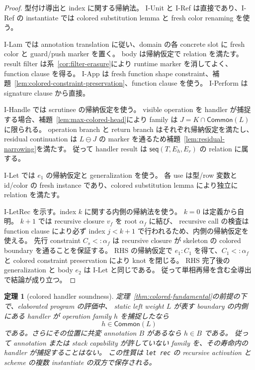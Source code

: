 \documentclass[uplatex,dvipdfmx,a4paper,10.5pt]{jsarticle}
\theoremstyle{jpplain}
\newtheorem{theorem}[definition]{定理}
\newcommand{\seq}{\mathsf{seq}}
\newcommand{\Common}{\mathsf{Common}}
\begin{document}
\begin{proof}
型付け導出と index に関する帰納法。
I-Unit と I-Ref は直接であり、I-Ref の instantiate では colored substitution lemma と fresh color renaming を使う。

I-Lam では annotation translation に従い、domain の各 concrete slot に fresh color と guard/push marker を置く。
body は帰納仮定で relation を満たす。
result filter は系~\ref{cor:filter-erasure}により runtime marker を消してよく、function clause を得る。
I-App は fresh function shape constraint、補題~\ref{lem:colored-constraint-preservation}、function clause を使う。
I-Perform は signature clause から直接。

I-Handle では scrutinee の帰納仮定を使う。
visible operation を handler が捕捉する場合、補題~\ref{lem:max-colored-head}により family は
$J=K\cap\Common(L)$ に限られる。
operation branch と return branch はそれぞれ帰納仮定を満たし、residual continuation は
$L\ominus J$ の marker を通るため補題~\ref{lem:residual-narrowing}を満たす。
従って handler result は $\seq(T,E_h,E_r)$ の relation に属する。

I-Let では $e_1$ の帰納仮定と generalization を使う。
各 use は型/row 変数と id/color の fresh instance であり、colored substitution lemma により独立に relation を満たす。

I-LetRec を示す。index $k$ に関する内側の帰納法を使う。
$k=0$ は定義から自明。
$k+1$ では recursive closure $v_f$ を root $\alpha_f$ に結び、
recursive call の検査は function clause により必ず index $j<k+1$ で行われるため、内側の帰納仮定を使える。
先行 constraint $C_s<:\alpha_f$ は recursive closure が skeleton の colored boundary を通ることを保証する。
RHS の帰納仮定で $e_1:C_1$ を得て、$C_1<:\alpha_f$ と
colored constraint preservation により knot を閉じる。
RHS 完了後の generalization と body $e_2$ は I-Let と同じである。
従って単相再帰を含む全導出で結論が成り立つ。
\end{proof}

\begin{theorem}[colored handler soundness]\label{thm:colored-handler-soundness}
定理~\ref{thm:colored-fundamental}の前提の下で、elaborated program の評価中、
static left weight $L$ が表す boundary の内側にある handler が operation family $h$ を捕捉したなら
\[
  h\in\Common(L)
\]
である。さらにその位置に共変 annotation $B$ があるなら $h\in B$ である。
従って annotation または stack capability が許していない family を、その寿命内の handler が捕捉することはない。
この性質は \texttt{let rec} の recursive activation と scheme の複数 instantiate の双方で保存される。
\end{theorem}
\end{document}
